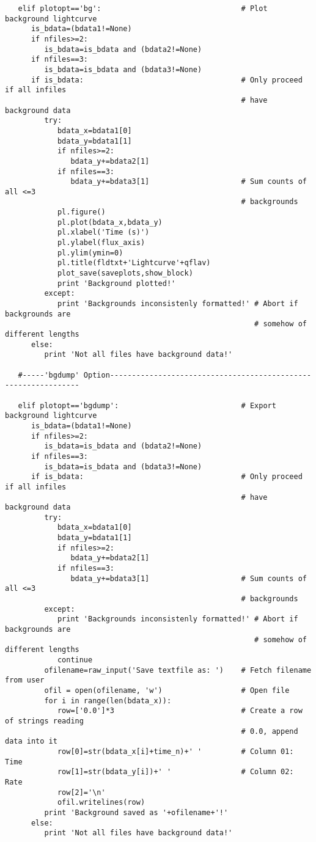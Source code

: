 \begin{verbatim}
   elif plotopt=='bg':                                # Plot background lightcurve
      is_bdata=(bdata1!=None)
      if nfiles>=2:
         is_bdata=is_bdata and (bdata2!=None)
      if nfiles==3:
         is_bdata=is_bdata and (bdata3!=None)
      if is_bdata:                                    # Only proceed if all infiles
                                                      # have background data
         try:
            bdata_x=bdata1[0]
            bdata_y=bdata1[1]
            if nfiles>=2:
               bdata_y+=bdata2[1]
            if nfiles==3:
               bdata_y+=bdata3[1]                     # Sum counts of all <=3
                                                      # backgrounds 
            pl.figure()
            pl.plot(bdata_x,bdata_y)
            pl.xlabel('Time (s)')
            pl.ylabel(flux_axis)
            pl.ylim(ymin=0)
            pl.title(fldtxt+'Lightcurve'+qflav)
            plot_save(saveplots,show_block)
            print 'Background plotted!'
         except:
            print 'Backgrounds inconsistenly formatted!' # Abort if backgrounds are
                                                         # somehow of different lengths
      else:
         print 'Not all files have background data!'

   #-----'bgdump' Option---------------------------------------------------------------

   elif plotopt=='bgdump':                            # Export background lightcurve
      is_bdata=(bdata1!=None)
      if nfiles>=2:
         is_bdata=is_bdata and (bdata2!=None)
      if nfiles==3:
         is_bdata=is_bdata and (bdata3!=None)
      if is_bdata:                                    # Only proceed if all infiles
                                                      # have background data
         try:
            bdata_x=bdata1[0]
            bdata_y=bdata1[1]
            if nfiles>=2:
               bdata_y+=bdata2[1]
            if nfiles==3:
               bdata_y+=bdata3[1]                     # Sum counts of all <=3
                                                      # backgrounds
         except:
            print 'Backgrounds inconsistenly formatted!' # Abort if backgrounds are
                                                         # somehow of different lengths
            continue
         ofilename=raw_input('Save textfile as: ')    # Fetch filename from user
         ofil = open(ofilename, 'w')                  # Open file
         for i in range(len(bdata_x)):
            row=['0.0']*3                             # Create a row of strings reading
                                                      # 0.0, append data into it
            row[0]=str(bdata_x[i]+time_n)+' '         # Column 01: Time
            row[1]=str(bdata_y[i])+' '                # Column 02: Rate
            row[2]='\n'
            ofil.writelines(row) 
         print 'Background saved as '+ofilename+'!'
      else:
         print 'Not all files have background data!'


\end{verbatim}
